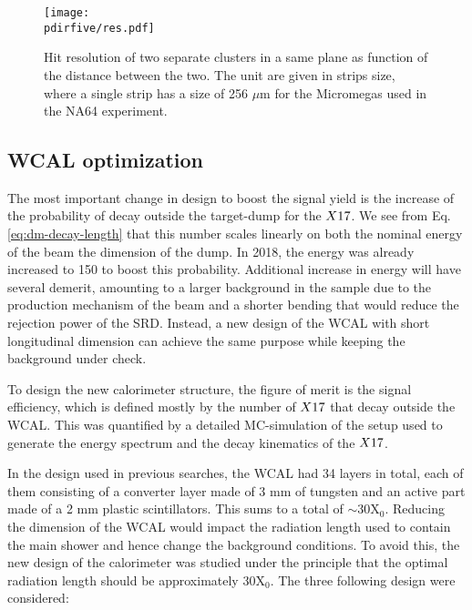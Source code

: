 \begin{figure}[tbh!]
  \centering
  \texttt{[image: \\pdirfive/res.pdf]}
  \caption[Hit resolution as function of the two cluster distance]{Hit resolution of two separate clusters in a same plane as function of the distance between the two. The unit are given in strips size, where a single strip has a size of 256 $\mu$m for the Micromegas used in the NA64 experiment.}
  \label{fig:res-hit}
\end{figure}

\subsection{WCAL optimization}
\label{ch5:sec:new-vismode-setup-wcal}

The most important change in design to boost the signal yield is the increase of the probability of decay outside the target-dump for the $X17$. We see from Eq.\ref{eq:dm-decay-length} that this number scales linearly on both the nominal energy of the beam the dimension of the dump. In 2018, the energy was already increased to 150 \gev to boost this probability. Additional increase in energy will have several demerit, amounting to a larger background in the sample due to the production mechanism of the beam and a shorter bending that would reduce the rejection power of the SRD. Instead, a new design of the WCAL with short longitudinal dimension can achieve the same purpose while keeping the background under check.

To design the new calorimeter structure, the figure of merit is the signal efficiency, which is defined mostly by the number of $X17$ that decay outside the WCAL. This was quantified by a detailed MC-simulation of the setup used to generate the energy spectrum and the decay kinematics of the $X17$.

In the design used in previous searches, the WCAL had 34 layers in total, each of them consisting of a converter layer made of 3 mm of tungsten and an active part made of a 2 mm plastic scintillators. This sums to a total of $\sim$30X$_0$. Reducing the dimension of the WCAL would impact the radiation length used to contain the main shower and hence change the background conditions. To avoid this, the new design of the calorimeter was studied under the principle that the optimal radiation length should be approximately 30X$_0$. The three following design were considered:

